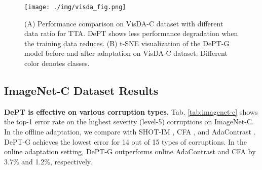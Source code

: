 \documentclass{article} \usepackage{iclr2023_conference,times}
\begin{document}
\begin{figure}[tb]
\begin{center}
\texttt{[image: ./img/visda\_fig.png]}
\end{center}
\caption{(A) Performance comparison on VisDA-C dataset with different data ratio for TTA. DePT shows less performance degradation when the training data reduces. (B) t-SNE visualization of the DePT-G model before and after adaptation on VisDA-C dataset. Different color denotes classes.}
\label{fig:data_ratio}
\end{figure}


\subsection{ImageNet-C Dataset Results}

\textbf{DePT is effective on various corruption types.} Tab. \ref{tab:imagenet-c} shows the top-1 error rate on the highest severity (level-5) corruptions on ImageNet-C. In the offline adaptation, we compare with SHOT-IM \citep{liang2020we}, CFA \citep{kojima2022robustifying}, and AdaContrast \citep{chen2022contrastive}. DePT-G achieves the lowest error for 14 out of 15 types of corruptions. In the online adaptation setting, DePT-G outperforms online AdaContrast and CFA by 3.7\% and 1.2\%, respectively.
\end{document}
